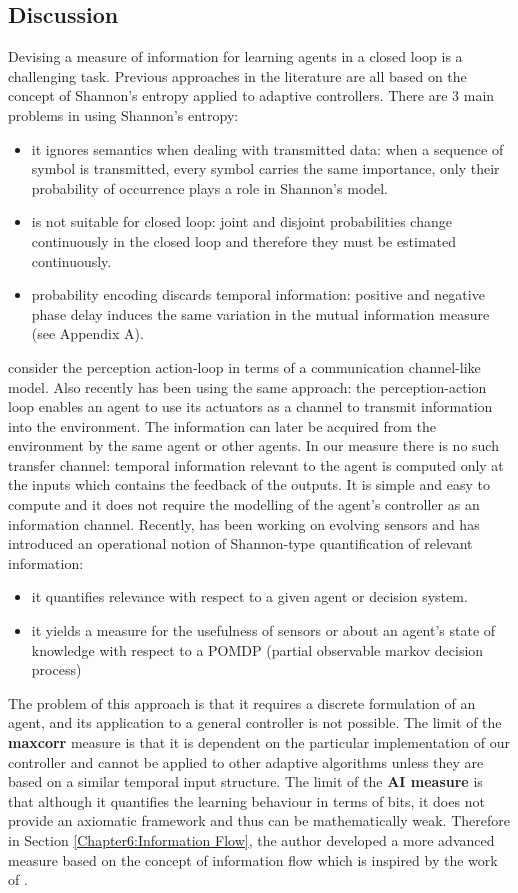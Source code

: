 \subsection{Discussion}
Devising a measure of information for learning agents in a closed loop is a challenging task.
Previous approaches in the literature are all based on the concept of Shannon's
entropy applied to adaptive controllers.
There are 3 main problems in using Shannon's entropy:
\begin{itemize}
 \item it ignores semantics when dealing with transmitted data: when a sequence of
symbol is transmitted, every symbol carries the same importance, only their probability
 of occurrence plays a role in Shannon's model.
\item is not suitable for closed loop: joint and disjoint probabilities change continuously
 in the closed loop and therefore they must be estimated continuously.
\item probability encoding discards temporal information: positive and negative phase
 delay induces the same variation in the mutual information measure (see Appendix A).
\end{itemize}
\citet{PhysRevLett.84.1156} consider the perception action-loop
 in terms of a communication channel-like model.
Also \citet{organizationInfo} recently has been using the
same approach: the perception-action loop enables an agent to use its actuators
as a channel to transmit information into the environment.
The information can later be acquired from the environment by the same agent or other agents.
 In our measure there is no such transfer channel: temporal information
relevant to the agent is computed only at the inputs which contains the feedback
 of the outputs. It is simple and easy to compute and it does not require the modelling of the agent's
 controller as an information channel.
Recently, \citet{shannonSemantic} has been working on evolving sensors and has
 introduced an operational notion of Shannon-type quantification of relevant information:
\begin{itemize}
 \item it quantifies relevance with respect to a given agent or decision system.
 \item it yields a measure for the usefulness of sensors or about an agent's state
of knowledge with respect to a POMDP (partial observable markov decision process)
\end{itemize}
The problem of this approach is that it requires a discrete formulation of
an agent, and its application to a general controller is not possible.
The limit of the \textbf{maxcorr} measure is that it is dependent on the particular implementation
of our controller and cannot be applied to other adaptive algorithms unless
they are based on a similar temporal input structure.
The limit of the \textbf{AI measure} is that although it quantifies the learning
behaviour in terms of bits, it does not provide an axiomatic framework and
thus can be mathematically weak.
Therefore in Section \ref{Chapter6:Information Flow}, the author developed a more
advanced measure based on the concept of information flow which is inspired by the
work of \citet{LungarellaInformation}.



